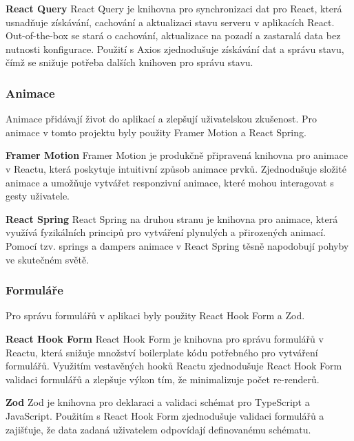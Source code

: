 \textbf{React Query}
React Query je knihovna pro synchronizaci dat pro React, která usnadňuje získávání, cachování a aktualizaci stavu serveru v aplikacích React.
Out-of-the-box se stará o cachování, aktualizace na pozadí a zastaralá data bez nutnosti konfigurace.
Použití s Axios zjednodušuje získávání dat a správu stavu, čímž se snižuje potřeba dalších knihoven pro správu stavu.

\subsubsection{Animace}
\label{subsubsec:implementace-techologie-ostatni-animace}
Animace přidávají život do aplikací a zlepšují uživatelskou zkušenost.
Pro animace v tomto projektu byly použity Framer Motion a React Spring.

\textbf{Framer Motion}
Framer Motion je produkčně připravená knihovna pro animace v Reactu, která poskytuje intuitivní způsob animace prvků.
Zjednodušuje složité animace a umožňuje vytvářet responzivní animace, které mohou interagovat s gesty uživatele.

\textbf{React Spring}
React Spring na druhou stranu je knihovna pro animace, která využívá fyzikálních principů pro vytváření plynulých a přirozených animací.
Pomocí tzv.
springs a dampers animace v React Spring těsně napodobují pohyby ve skutečném světě.

\subsubsection{Formuláře}
\label{subsubsec:implementace-techologie-ostatni-formulare}
Pro správu formulářů v aplikaci byly použity React Hook Form a Zod.

\textbf{React Hook Form}
React Hook Form je knihovna pro správu formulářů v Reactu, která snižuje množství boilerplate kódu potřebného pro vytváření formulářů.
Využitím vestavěných hooků Reactu zjednodušuje React Hook Form validaci formulářů a zlepšuje výkon tím, že minimalizuje počet re-renderů.

\textbf{Zod}
Zod je knihovna pro deklaraci a validaci schémat pro TypeScript a JavaScript.
Použitím s React Hook Form zjednodušuje validaci formulářů a zajišťuje, že data zadaná uživatelem odpovídají definovanému schématu.

